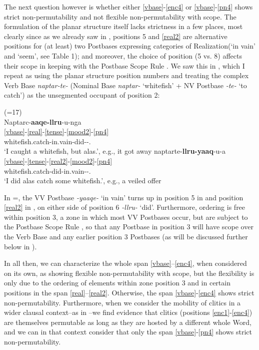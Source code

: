 \documentclass[output=paper]{langscibook}
\begin{document}
The next question however is whether either \ref{vbase}-\ref{enc4} or \ref{vbase}-\ref{pn4} shows strict non-permutability and not flexible non-permutability with scope. The formulation of the planar structure itself lacks strictness in a few places, most clearly since as we already saw in , positions 5 and \ref{real2} are alternative positions for (at least) two Postbases expressing categories of Realization(`in vain' and `seem', see Table 1); and moreover, the choice of position (5 vs. 8) affects their scope in keeping with the Postbase Scope Rule . We saw this in , which I repeat as  using the planar structure position numbers and treating the complex Verb Base \textit{naptar-te-} (Nominal Base \textit{naptar-} `whitefish' + NV Postbase \textit{{}-te-} `to catch') as the unsegmented occupant of position 2:

\ea\label{ex:key:30} {(=17)}\\
\ea\label{ex:key:30a}
\glll Naptarc-\textbf{aaqe-llru}{}-u-nga\\
    \ref{vbase}-\ref{real}-\ref{tense}-\ref{mood2}-\ref{pn4}\\
     whitefish.catch-in.vain-did-\Ind{}-\Fsg.\Sarg{}\\
\glt `I caught a whitefish, but alas.', e.g., it got away
\ex\label{ex:key:30b}
\glll naptarte-\textbf{llru-yaaq}{}-u-a\\
    \ref{vbase}-\ref{tense}-\ref{real2}-\ref{mood2}-\ref{pn4}\\
     whitefish.catch-did-in.vain-\Ind{}-\Fsg.\Sarg{}\\
\glt `I did alas catch some whitefish.', e.g., a veiled offer
\z
\z

In =, the VV Postbase \textit{-yaaqe-} `in vain' turns up in position 5 in  and position \ref{real2} in , on either side of position 6 \textit{{}-llru-} `did'. Furthermore, ordering is free within position 3, a zone in which most VV Postbases occur, but are subject to the Postbase Scope Rule , so that any Postbase in position 3 will have scope over the Verb Base and any earlier position 3 Postbases (as will be discussed further below in ).

In all then, we can characterize the whole span \ref{vbase}--\ref{enc4}, when considered on its own, as showing flexible non-permutability with scope, but the flexibility is only due to the ordering of elements within zone position 3 and in certain positions in the span \ref{real}--\ref{real2}. Otherwise, the span \ref{vbase}-\ref{enc4} shows strict non-permutability. Furthermore, when we consider the mobility of clitics in a wider clausal context--as in --we find evidence that clitics (positions \ref{enc1}-\ref{enc4}) are themselves permutable as long as they are hosted by a different whole Word, and we can in that context consider that only the span \ref{vbase}-\ref{pn4} shows strict non-permutability.
\end{document}

